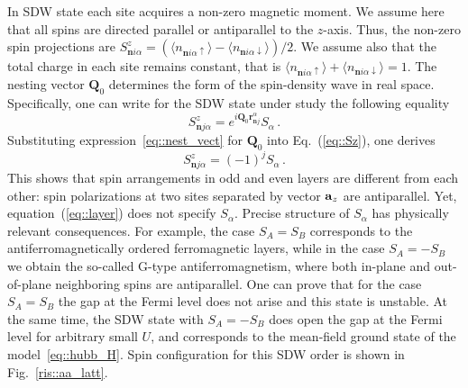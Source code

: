 \documentclass[prb,twocolumn,showpacs,aps,superscriptaddress,floatfix]{revtex4}
\begin{document}
In SDW state each site acquires a non-zero magnetic moment. We assume here
that all spins are directed parallel or antiparallel to the
$z$-axis.
Thus, the non-zero spin projections are
$S_{\mathbf{n}i\alpha}^{z}
=
(
	\langle n_{\mathbf{n}i\alpha\uparrow}\rangle
	-
	\langle n_{\mathbf{n}i\alpha\downarrow}\rangle
)/2$.
We assume also that the total charge in each site remains constant, that is
$\langle n_{\mathbf{n}i\alpha\uparrow}\rangle
+
\langle n_{\mathbf{n}i\alpha\downarrow}\rangle=1$.
The nesting vector
$\mathbf{Q}_0$
determines the form of the spin-density wave in real space. Specifically,
one can write for the SDW state under study the following equality
\begin{equation}
\label{eq::Sz}
S_{\mathbf{n}j\alpha}^{z}
=
e^{i\mathbf{Q}_0\mathbf{r}_{\mathbf{n}j}^{\alpha}}S_{\alpha}\,.
\end{equation}
Substituting
expression~\eqref{eq::nest_vect}
for
$\mathbf{Q}_0$
into
Eq.~(\ref{eq::Sz}),
one derives
\begin{equation}
\label{eq::layer}
S_{\mathbf{n}j\alpha}^{z}=(-1)^{j}S_{\alpha}\,.
\end{equation}
This shows that spin arrangements in odd and even layers are different from
each other: spin polarizations at two sites separated by vector
${\bf a}_z$
are antiparallel. Yet,
equation~(\ref{eq::layer})
does not specify
$S_{\alpha}$.
Precise structure of
$S_{\alpha}$
has physically relevant consequences. For example, the case
$S_A=S_B$
corresponds to the antiferromagnetically ordered ferromagnetic layers,
while in the case
$S_A=-S_B$
we obtain the so-called G-type antiferromagnetism, where both in-plane and
out-of-plane neighboring spins are antiparallel. One can prove that for the
case
$S_A=S_B$
the gap at the Fermi level does not arise and this state is unstable. At
the same time, the SDW state with
$S_A=-S_B$
does open the gap at the Fermi level for arbitrary small $U$, and
corresponds to the mean-field ground state of the
model~\eqref{eq::hubb_H}.
Spin configuration for this SDW order is shown in
Fig.~\ref{ris::aa_latt}.
\end{document}
